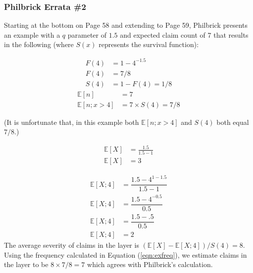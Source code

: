 \documentclass[]{article} %
\begin{document}
\subsubsection{Philbrick Errata \#2}
Starting at the bottom on Page 58 and extending to Page 59, Philbrick presents an example with a $q$ parameter of $1.5$ and expected claim count of 7 that results in the following (where $S(x)$ represents the survival function):

\begin{align}
F(4) &= 1 - 4^{-1.5}\nonumber\\
F(4) &= 7/8\nonumber\\
S(4) &= 1 - F(4) = 1/8\nonumber
\end{align}
\begin{align}
\mathbb{E}[n] &= 7\nonumber\\
\mathbb{E}[n; x > 4] &= 7 \times S(4) = 7/8\label{eqn:exfreq}
\end{align}

(It is unfortunate that, in this example both $\mathbb{E}[n; x > 4]$ and $S(4)$ both equal $7/8$.)

\begin{align}
\mathbb{E}[X] &= \frac{1.5}{1.5-1}\nonumber\\
\mathbb{E}[X] &= 3\nonumber
\end{align}

\begin{align}
\mathbb{E}[X; 4] &= \dfrac{1.5 - 4^{1-1.5}}{1.5-1}\nonumber\\
\mathbb{E}[X; 4] &= \dfrac{1.5 - 4^{-0.5}}{0.5}\nonumber\\
\mathbb{E}[X; 4] &= \dfrac{1.5 - .5}{0.5}\nonumber\\
\mathbb{E}[X; 4] &= 2\nonumber
\end{align}
The average severity of claims in the layer is $(\mathbb{E}[X] - \mathbb{E}[X; 4]) / S(4) = 8$. Using the frequency calculated in Equation (\ref{eqn:exfreq}), we estimate claims in the layer to be $8 \times 7 / 8 = 7$ which agrees with Philbrick's calculation.
\end{document}

